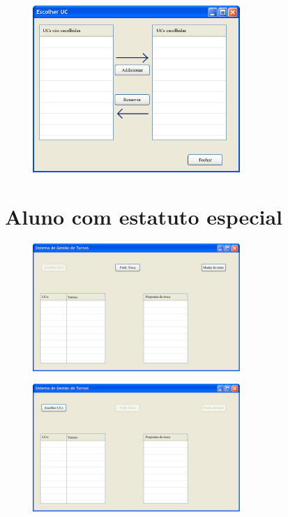 \documentclass[12pt,a4paper]{report}
\begin{document}
\begin{appendices}
\begin{figure}[H]
	\centering 
	\includegraphics[width=0.7\textwidth]{modelacao/mockups/alunoescolherucs.png}  
\end{figure}

\section{Aluno com estatuto especial}
\begin{figure}[H]
	\centering 
	\includegraphics[width=0.7\textwidth]{modelacao/mockups/alunoe11111.png}  
\end{figure}

\begin{figure}[H]
	\centering 
	\includegraphics[width=0.7\textwidth]{modelacao/mockups/alunoe11110.png}  
\end{figure}


\end{appendices}
\end{document}
